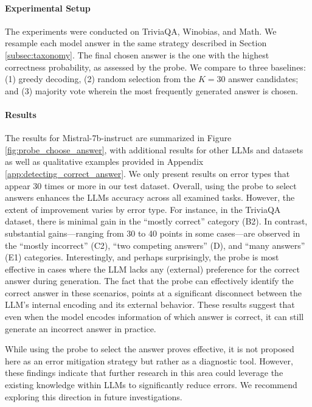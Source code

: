 \documentclass{article} %
\begin{document}
\paragraph{Experimental Setup}
The experiments were conducted on TriviaQA, Winobias, and Math.
We resample each model answer in the same strategy described in Section \ref{subsec:taxonomy}.
The final chosen answer is the one with the highest correctness probability, as assessed by the probe.
We compare to three baselines:
(1) greedy decoding, (2) random selection from the $K=30$ answer candidates; and (3) majority vote wherein the most frequently generated answer is chosen.

\paragraph{Results}
The results for Mistral-7b-instruct are summarized in Figure \ref{fig:probe_choose_answer}, with additional results for other LLMs and datasets as well as qualitative examples provided in Appendix \ref{app:detecting_correct_answer}.
We only present results on error types that appear 30 times or more in our test dataset.
Overall, using the probe to select answers enhances the LLMs accuracy across all examined tasks.
However, the extent of improvement varies by error type.
For instance, in the TriviaQA dataset, there is minimal gain in the ``mostly correct'' category (B2).
In contrast, substantial gains---ranging from 30 to 40 points in some cases---are observed in the ``mostly incorrect'' (C2), ``two competing answers'' (D), and ``many answers'' (E1) categories.
Interestingly, and perhaps surprisingly, the probe is most effective in cases where the LLM lacks any (external) preference for the correct answer during generation.
The fact that the probe can effectively identify the correct answer in these scenarios, points at a significant disconnect between the LLM's internal encoding and its external behavior. These results suggest that even when the model encodes information of which answer is correct, it can still generate an incorrect answer in practice.

While using the probe to select the answer proves effective, it is not proposed here as an error mitigation strategy but rather as a diagnostic tool. However, these findings indicate that further research in this area could leverage the existing knowledge within LLMs to significantly reduce errors. We recommend exploring this direction in future investigations.
\end{document}
